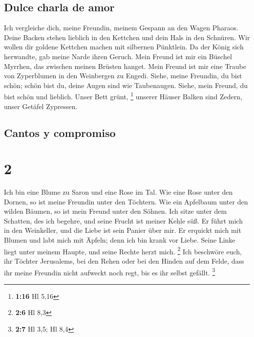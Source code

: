 \hypertarget{dulce-charla-de-amor}{%
\subsection{Dulce charla de amor}\label{dulce-charla-de-amor}}

 Ich vergleiche dich, meine Freundin, meinem Gespann an
den Wagen Pharaos.  Deine Backen stehen lieblich in den
Kettchen und dein Hals in den Schnüren.  Wir wollen dir
goldene Kettchen machen mit silbernen Pünktlein.  Da der
König sich herwandte, gab meine Narde ihren Geruch.  Mein
Freund ist mir ein Büschel Myrrhen, das zwischen meinen Brüsten hanget.
 Mein Freund ist mir eine Traube von Zyperblumen in den
Weinbergen zu Engedi.  Siehe, meine Freundin, du bist
schön; schön bist du, deine Augen sind wie Taubenaugen. 
Siehe, mein Freund, du bist schön und lieblich. Unser Bett grünt,
\footnote{\textbf{1:16} Hl 5,16}  unserer Häuser Balken
sind Zedern, unser Getäfel Zypressen.

\hypertarget{cantos-y-compromiso}{%
\subsection{Cantos y compromiso}\label{cantos-y-compromiso}}

\hypertarget{section-1}{%
\section{2}\label{section-1}}

 Ich bin eine Blume zu Saron und eine Rose im Tal.
 Wie eine Rose unter den Dornen, so ist meine Freundin
unter den Töchtern.  Wie ein Apfelbaum unter den wilden
Bäumen, so ist mein Freund unter den Söhnen. Ich sitze unter dem
Schatten, des ich begehre, und seine Frucht ist meiner Kehle süß.
 Er führt mich in den Weinkeller, und die Liebe ist sein
Panier über mir.  Er erquickt mich mit Blumen und labt
mich mit Äpfeln; denn ich bin krank vor Liebe.  Seine
Linke liegt unter meinem Haupte, und seine Rechte herzt mich.
\footnote{\textbf{2:6} Hl 8,3}  Ich beschwöre euch, ihr
Töchter Jerusalems, bei den Rehen oder bei den Hinden auf dem Felde,
dass ihr meine Freundin nicht aufweckt noch regt, bis es ihr selbst
gefällt. \footnote{\textbf{2:7} Hl 3,5; Hl 8,4}

